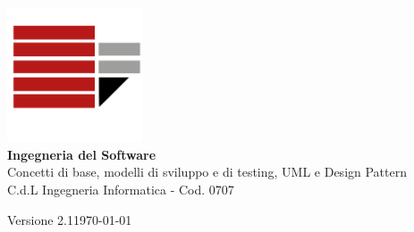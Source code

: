 \documentclass[a4paper,12pt,oneside]{book}
\begin{document}
\begin{titlepage}
    \centering
    
    \includegraphics[width=0.3\textwidth]{assets/logo.png}\\[3cm]
    
    {\huge\bfseries Ingegneria del Software}\\[0.5cm]
    
    {\Large Concetti di base, modelli di sviluppo e di testing, UML e Design Pattern}\\[0.5cm]

    {\small C.d.L Ingegneria Informatica - Cod. 0707}\\[0.5cm]
  
    \vfill
    
    {\large Versione 2.1}\hfill{\large \today}
        
\end{titlepage}

\tableofcontents








\end{document}
